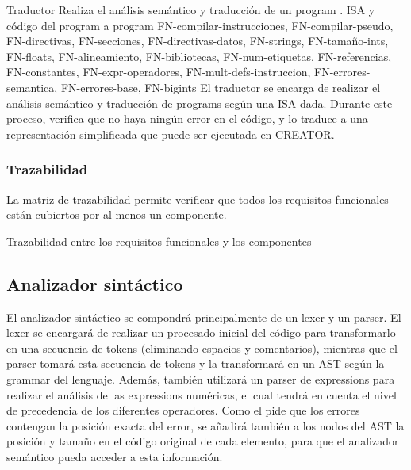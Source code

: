 \begin{component}{Traductor}
    {Realiza el análisis semántico y traducción de un \gls{program} .} %
    {\NA} %
    {\gls{ISA} y código del \gls{program} a } %
    {\Gls{program} } %
    {FN-compilar-instrucciones, FN-compilar-pseudo, FN-directivas,
    FN-secciones, FN-directivas-datos, FN-strings, FN-tamaño-ints,
    FN-floats, FN-alineamiento, FN-bibliotecas, FN-num-etiquetas,
    FN-referencias, FN-constantes, FN-expr-operadores,
    FN-mult-defs-instruccion, FN-errores-semantica, FN-errores-base, FN-bigints} %
    El traductor se encarga de realizar el análisis semántico y traducción
    de \glspl{program}  según una \gls{ISA} dada.
    Durante este proceso, verifica que no haya ningún error en el código, y lo
    traduce a una representación simplificada que puede ser ejecutada en
    CREATOR.
\end{component}

\let\componentref\undefined

\FloatBarrier

\subsubsection{Trazabilidad}

La matriz de trazabilidad permite verificar que todos los requisitos funcionales
están cubiertos por al menos un componente.

\begin{landscape}
        {Trazabilidad entre los requisitos funcionales y los componentes}
\end{landscape}

\FloatBarrier

\subsection{Analizador sintáctico}

El analizador sintáctico se compondrá principalmente de un \gls{lexer} y un
\gls{parser}. El \gls{lexer} se encargará de realizar un procesado inicial del
código para transformarlo en una secuencia de \glspl{token} (eliminando espacios
y comentarios), mientras que el \gls{parser} tomará esta secuencia de
\glspl{token} y la transformará en un \gls{AST} según la \gls{grammar} del
lenguaje. Además, también utilizará un \gls{parser} de \glspl{expression} para
realizar el análisis de las \glspl{expression} numéricas, el cual tendrá en
cuenta el nivel de precedencia de los diferentes operadores. Como el
 pide que los errores contengan la posición exacta del
error, se añadirá también a los nodos del \gls{AST} la posición y tamaño en el
código original de cada elemento, para que el analizador semántico pueda acceder
a esta información.

